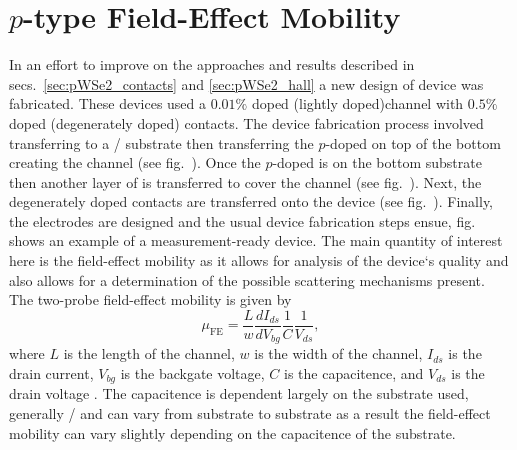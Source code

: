 \section{$p$-type  Field-Effect Mobility}\label{sec:pWSe2_hbn}
In an effort to improve on the approaches and results described in secs.~\ref{sec:pWSe2_contacts} and \ref{sec:pWSe2_hall} a new design of device was fabricated. These devices used a $0.01\%$  doped  (lightly doped)channel with $0.5\%$ doped  (degenerately doped) contacts. The device fabrication process involved transferring \hbn to a / substrate then transferring the $p$-doped  on top of the bottom \hbn creating the channel (see fig.~). Once the $p$-doped  is on the bottom \hbn substrate then another layer of \hbn is transferred to cover the channel (see fig.~). Next, the degenerately doped  contacts are transferred onto the device (see fig.~). Finally, the electrodes are designed and the usual device fabrication steps ensue, fig.~ shows an example of a measurement-ready device. The main quantity of interest here is the field-effect mobility as it allows for analysis of the device`s quality and also allows for a determination of the possible scattering mechanisms present. The two-probe field-effect mobility is given by 
\begin{equation}\label{eq:mu_fe}
	\mu_\mathrm{FE} = \frac{L}{w}\frac{d I_{ds}}{d V_{bg}}\frac{1}{C}\frac{1}{V_{ds}},
\end{equation}
where $L$ is the length of the channel, $w$ is the width of the channel, $I_{ds}$ is the drain current, $V_{bg}$ is the backgate voltage, $C$ is the capacitence, and $V_{ds}$ is the drain voltage \cite{Stassen_AppPhysLett2004}. The capacitence is dependent largely on the substrate used, generally / and can vary from substrate to substrate as a result the field-effect mobility can vary slightly depending on the capacitence of the substrate.  \\ \\
